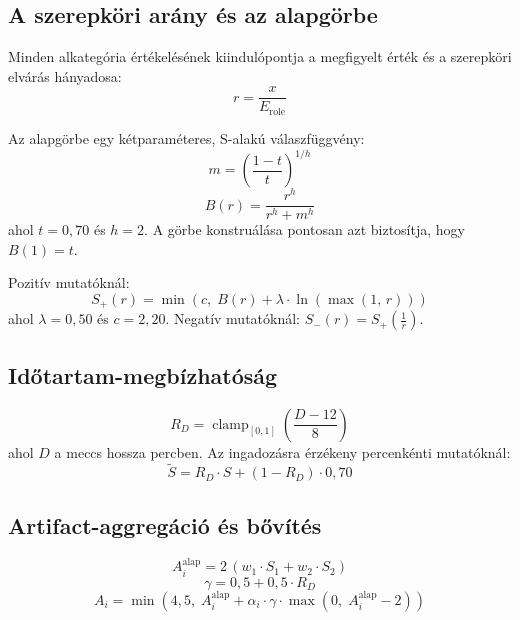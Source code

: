\subsection{A szerepköri arány és az alapgörbe}

Minden alkategória értékelésének kiindulópontja a megfigyelt érték és a szerepköri elvárás hányadosa:
\begin{equation}
r = \frac{x}{E_{\text{role}}}
\end{equation}

Az alapgörbe egy kétparaméteres, S-alakú válaszfüggvény:
\begin{equation}
m = \left(\frac{1-t}{t}\right)^{1/h}
\end{equation}
\begin{equation}
B(r) = \frac{r^h}{r^h + m^h}
\end{equation}
ahol $t = 0{,}70$ és $h = 2$. A görbe konstruálása pontosan azt biztosítja, hogy $B(1) = t$.

Pozitív mutatóknál:
\begin{equation}
S_+(r) = \min\!\left(c,\; B(r) + \lambda \cdot \ln\!\left(\max(1,\, r)\right)\right)
\end{equation}
ahol $\lambda = 0{,}50$ és $c = 2{,}20$. Negatív mutatóknál: $S_-(r) = S_+\!\left(\frac{1}{r}\right)$.

\subsection{Időtartam-megbízhatóság}

\begin{equation}
R_D = \operatorname{clamp}_{[0,1]}\!\left(\frac{D - 12}{8}\right)
\end{equation}
ahol $D$ a meccs hossza percben. Az ingadozásra érzékeny percenkénti mutatóknál:
\begin{equation}
\tilde{S} = R_D \cdot S + (1 - R_D) \cdot 0{,}70
\end{equation}

\subsection{Artifact-aggregáció és bővítés}

\begin{equation}
A_i^{\text{alap}} = 2\,(w_1 \cdot S_1 + w_2 \cdot S_2)
\end{equation}
\begin{equation}
\gamma = 0{,}5 + 0{,}5 \cdot R_D
\end{equation}
\begin{equation}
A_i = \min\!\left(4{,}5,\; A_i^{\text{alap}} + \alpha_i \cdot \gamma \cdot \max\!\left(0,\; A_i^{\text{alap}} - 2\right)\right)
\end{equation}

